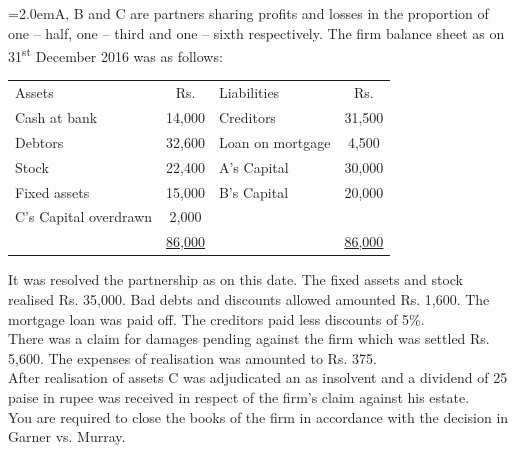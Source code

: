 \documentclass[11pt,a4paper]{article}
\newcommand{\lqn}[2]{\Needspace{6\baselineskip}\par\medskip\noindent\hangindent=2.0em\hangafter=1\makebox[2.0em][l]{\textbf{#1.}}#2\par}
\begin{document}
\lqn{117}{A, B and C are partners sharing profits and losses in the proportion of one – half, one – third and one – sixth respectively. The firm balance sheet as on 31\textsuperscript{st} December 2016 was as follows:\par
\par\smallskip\noindent\hspace*{1.2em}\begin{tabular}{|lclc|}
\hline
Assets & Rs. & Liabilities & Rs. \\
Cash at bank & 14,000 & Creditors & 31,500 \\
Debtors & 32,600 & Loan on mortgage & 4,500 \\
Stock & 22,400 & A’s Capital & 30,000 \\
Fixed assets & 15,000 & B’s Capital & 20,000 \\
C’s Capital overdrawn & 2,000 &  &  \\
 & \underline{86,000} &  & \underline{86,000} \\
\hline
\end{tabular}\par\smallskip
It was resolved the partnership as on this date. The fixed assets and stock realised Rs. 35,000. Bad debts and discounts allowed amounted Rs. 1,600. The mortgage loan was paid off. The creditors paid less discounts of 5\%.\\
There was a claim for damages pending against the firm which was settled Rs. 5,600. The expenses of realisation was amounted to Rs. 375.\\
After realisation of assets C was adjudicated an as insolvent and a dividend of 25 paise in rupee was received in respect of the firm’s claim against his estate.\\
You are required to close the books of the firm in accordance with the decision in Garner vs. Murray.\par
}
\end{document}
